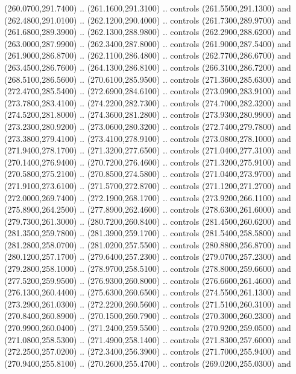 {\begin{scope}[y=0.80pt, x=0.80pt, yscale=-1, xscale=1, inner sep=0pt, outer sep=0pt, #1]
      (260.0700,291.7400) .. (261.1600,291.3100) .. controls (261.5500,291.1300) and
      (262.4800,291.0100) .. (262.1200,290.4000) .. controls (261.7300,289.9700) and
      (261.6800,289.3900) .. (262.1300,288.9800) .. controls (262.2900,288.6200) and
      (263.0000,287.9900) .. (262.3400,287.8000) .. controls (261.9000,287.5400) and
      (261.9000,286.8700) .. (262.1100,286.4800) .. controls (262.7700,286.6700) and
      (263.4500,286.7600) .. (264.1300,286.8100) .. controls (266.3100,286.7200) and
      (268.5100,286.5600) .. (270.6100,285.9500) .. controls (271.3600,285.6300) and
      (272.4700,285.5400) .. (272.6900,284.6100) .. controls (273.0900,283.9100) and
      (273.7800,283.4100) .. (274.2200,282.7300) .. controls (274.7000,282.3200) and
      (274.5200,281.8000) .. (274.3600,281.2800) .. controls (273.9300,280.9900) and
      (273.2300,280.9200) .. (273.0600,280.3200) .. controls (272.7400,279.7800) and
      (273.3800,279.4100) .. (273.4100,278.9100) .. controls (273.0800,278.1000) and
      (271.9400,278.1700) .. (271.3200,277.6500) .. controls (271.0400,277.3100) and
      (270.1400,276.9400) .. (270.7200,276.4600) .. controls (271.3200,275.9100) and
      (270.5800,275.2100) .. (270.8500,274.5800) .. controls (271.0400,273.9700) and
      (271.9100,273.6100) .. (271.5700,272.8700) .. controls (271.1200,271.2700) and
      (272.0000,269.7400) .. (272.1900,268.1700) .. controls (273.9200,266.1100) and
      (275.8900,264.2500) .. (277.8900,262.4600) .. controls (278.6300,261.6000) and
      (279.7300,261.3000) .. (280.7200,260.8400) .. controls (281.4500,260.6200) and
      (281.3500,259.7800) .. (281.3900,259.1700) .. controls (281.5400,258.5800) and
      (281.2800,258.0700) .. (281.0200,257.5500) .. controls (280.8800,256.8700) and
      (280.1200,257.1700) .. (279.6400,257.2300) .. controls (279.0700,257.2300) and
      (279.2800,258.1000) .. (278.9700,258.5100) .. controls (278.8000,259.6600) and
      (277.5200,259.9500) .. (276.9300,260.8000) .. controls (276.6600,261.4600) and
      (276.1300,260.4400) .. (275.6300,260.6500) .. controls (274.5500,261.1300) and
      (273.2900,261.0300) .. (272.2200,260.5600) .. controls (271.5100,260.3100) and
      (270.8400,260.8900) .. (270.1500,260.7900) .. controls (270.3000,260.2300) and
      (270.9900,260.0400) .. (271.2400,259.5500) .. controls (270.9200,259.0500) and
      (271.0800,258.5300) .. (271.4900,258.1400) .. controls (271.8300,257.6000) and
      (272.2500,257.0200) .. (272.3400,256.3900) .. controls (271.7000,255.9400) and
      (270.9400,255.8100) .. (270.2600,255.4700) .. controls (269.0200,255.0300) and

\end{scope}}

